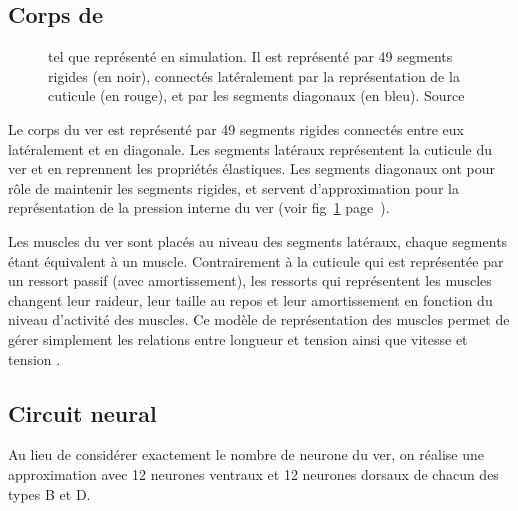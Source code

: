 \subsection{Corps de \celeg{}} %
\label{sub:Corps de \celeg{}}

\begin{figure}[ht]
   \begin{center}
   \end{center}
   \caption{\celeg{} tel que représenté en simulation. Il est représenté
   par 49 segments rigides (en noir), connectés latéralement par la représentation
   de la cuticule (en rouge), et par les segments diagonaux (en bleu). Source
   \cite{Boyle2009}}
   \label{fig:celegans_representation}
\end{figure}

Le corps du ver est représenté par 49 segments rigides connectés entre eux
latéralement et en diagonale. Les segments latéraux représentent la cuticule du
ver et en reprennent les propriétés élastiques. Les segments diagonaux ont pour
rôle de maintenir les segments rigides, et servent d'approximation pour la
représentation de la pression interne du ver (voir
fig~\ref{fig:celegans_representation}
page~\pageref{fig:celegans_representation}).

Les muscles du ver sont placés au niveau des segments latéraux, chaque segments
étant équivalent à un muscle. Contrairement à la cuticule qui est représentée par un
ressort passif (avec amortissement), les ressorts qui représentent les muscles
changent leur raideur, leur taille au repos et leur amortissement en fonction du niveau
d'activité des muscles. Ce modèle de représentation des muscles permet de gérer
simplement les relations entre longueur et tension ainsi que vitesse et tension
\cite{Boyle2009}.


\subsection{Circuit neural} %
\label{sub:Circuit neural}

Au lieu de considérer exactement le nombre de neurone du ver, on réalise une
approximation avec 12 neurones ventraux et 12 neurones dorsaux de chacun des types
B et D.

